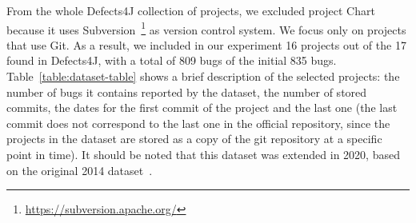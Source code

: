 
From the whole Defects4J collection of projects, we excluded project Chart because it uses Subversion~\footnote{\url{https://subversion.apache.org/}} as version control system. 
We focus only on projects that use Git. 
As a result, we included in our experiment 16 projects out of the 17 found in Defects4J, with a total of 809 bugs of the initial 835 bugs.
Table~\ref{table:dataset-table} shows a brief description of the selected projects: the number of bugs it contains reported by the dataset, the number of stored commits, the dates for the first commit of the project and the last one (the last commit does not correspond to the last one in the official repository, since the projects in the dataset are stored as a copy of the git repository at a specific point in time). 
It should be noted that this dataset was extended in 2020, based on the original 2014 dataset~\cite{just2014defects4j}.

